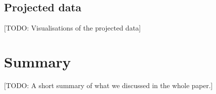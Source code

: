 \documentclass[dtu]{dtuarticle}
\newcommand{\todo}[1]{\color{red}[TODO: #1]\color{black}}
\begin{document}
	\subsection{Projected data}

	\todo{Visualisations of the projected data}

	\section*{Summary}

	\todo{A short summary of what we discussed in the whole paper.}

	
	
\end{document}
